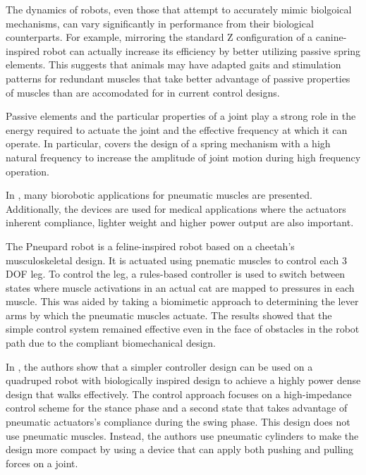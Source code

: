 
The dynamics of robots, even those that attempt to accurately mimic biolgoical
mechanisms, can vary significantly in performance from their biological
counterparts. For example, mirroring the standard Z configuration of a canine-
inspired robot can actually increase its efficiency by better utilizing passive
spring elements. This suggests that animals may have adapted gaits and
stimulation patterns for redundant muscles that take better advantage of passive
properties of muscles than are accomodated for in current control designs.
\cite{HindLegMorphology}

Passive elements and the particular properties of a joint play a strong role in
the energy required to actuate the joint and the effective frequency at which it
can operate. In particular, \cite{Na2015} covers the design of a spring
mechanism with a high natural frequency to increase the amplitude of joint
motion during high frequency operation.



In \cite{PAMApplicationSurvey}, many biorobotic applications for pneumatic
muscles are presented.
Additionally, the devices are used for medical applications where the actuators
inherent compliance, lighter weight and higher power output are also important. 

The Pneupard robot is a feline-inspired robot based on a cheetah's
musculoskeletal design. It is actuated using pnematic muscles to control each 3
DOF leg. To control the leg, a rules-based controller is used to switch between
states where muscle activations in an actual cat are mapped to pressures in each
muscle. This was aided by taking a biomimetic approach to determining the lever
arms by which the pneumatic muscles actuate. The results showed that the simple
control system remained effective even in the face of obstacles in the robot
path due to the compliant biomechanical design.
\cite{Pneupard2013}

In \cite{Wait2014}, the authors show that a simpler controller design can be
used on a quadruped robot with biologically inspired design to achieve a highly
power dense design that walks effectively. The control approach focuses on
a high-impedance control scheme for the stance phase and a second state
that takes advantage of pneumatic actuators's compliance during the swing phase.
This design does not use pneumatic muscles. Instead, the authors use pneumatic
cylinders to make the design more compact by using a device that can apply both
pushing and pulling forces on a joint. 

